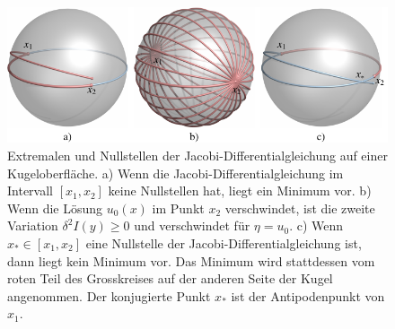 %
%
%
\begin{figure}
\centering
\includegraphics{chapters/060-variation2/images/jacobi.pdf}
\caption{Extremalen und Nullstellen der Jacobi-Differentialgleichung
auf einer Kugeloberfläche.
a) Wenn die Jacobi-Differentialgleichung im Intervall $[x_1,x_2]$ keine
Nullstellen hat, liegt ein Minimum vor.
b) Wenn die Lösung $u_0(x)$ im Punkt $x_2$ verschwindet, ist die
zweite Variation $\delta^2 I(y)\ge 0$ und verschwindet für $\eta = u_0$.
c) Wenn $x_*\in[x_1,x_2]$ eine Nullstelle der Jacobi-Differentialgleichung
ist, dann liegt kein Minimum vor.
Das Minimum wird stattdessen vom roten Teil des Grosskreises auf der anderen
Seite der Kugel angenommen.
Der konjugierte Punkt $x_*$ ist der Antipodenpunkt von $x_1$.
\label{buch:variation2:fig:jacobi}}
\end{figure}
